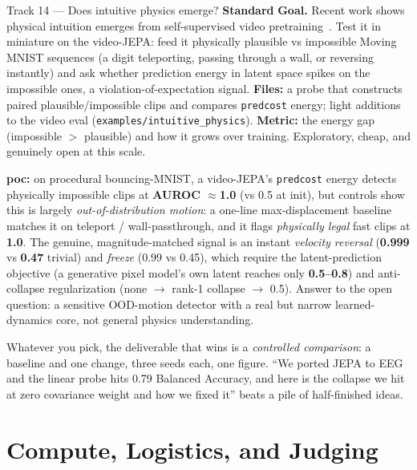 \documentclass{article}
\newcommand{\code}[1]{\texttt{\small #1}}
\newcommand{\diffmed}{\colorbox{ebamber!18}{\textcolor{ebamber}{\small\bfseries Standard}}}
\begin{document}
\begin{trackbox}{Track 14 --- Does intuitive physics emerge? \hfill \diffmed{}}
\textbf{Goal.} Recent work shows physical intuition emerges from self-supervised
video pretraining~\citep{garrido2025intuitivephysicsunderstandingemerges}. Test it
in miniature on the video-JEPA: feed it physically plausible vs impossible Moving
MNIST sequences (a digit teleporting, passing through a wall, or reversing
instantly) and ask whether prediction energy in latent space spikes on the
impossible ones, a violation-of-expectation signal. \textbf{Files:} a probe that
constructs paired plausible/impossible clips and compares \code{predcost} energy;
light additions to the video eval (\code{examples/intuitive\_physics}).
\textbf{Metric:} the energy gap (impossible $>$ plausible) and how it grows over
training. Exploratory, cheap, and genuinely open at this scale.

\textbf{poc:} on procedural bouncing-MNIST, a video-JEPA's \code{predcost} energy
detects physically impossible clips at \textbf{AUROC $\approx$1.0} (vs 0.5 at init),
but controls show this is largely \emph{out-of-distribution motion}: a one-line
max-displacement baseline matches it on teleport / wall-passthrough, and it flags
\emph{physically legal} fast clips at \textbf{1.0}. The genuine, magnitude-matched
signal is an instant \emph{velocity reversal} (\textbf{0.999} vs \textbf{0.47}
trivial) and \emph{freeze} (0.99 vs 0.45), which require the latent-prediction
objective (a generative pixel model's own latent reaches only \textbf{0.5--0.8})
and anti-collapse regularization (none $\rightarrow$ rank-1 collapse $\rightarrow$
0.5). Answer to the open question: a sensitive OOD-motion detector with a real but
narrow learned-dynamics core, not general physics understanding.
\end{trackbox}

\begin{tipbox}
Whatever you pick, the deliverable that wins is a \emph{controlled comparison}: a
baseline and one change, three seeds each, one figure. ``We ported JEPA to EEG and
the linear probe hits 0.79 Balanced Accuracy, and here is the collapse we hit at
zero covariance weight and how we fixed it'' beats a pile of half-finished ideas.
\end{tipbox}
\section{Compute, Logistics, and Judging}
\label{sec:logistics}
\end{document}
